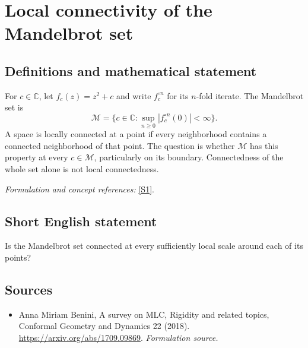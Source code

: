 \documentclass[11pt]{article}
\begin{document}
\section*{\texorpdfstring{Local connectivity of the Mandelbrot set}{Local connectivity of the Mandelbrot set}}\label{statement}
\subsection{Definitions and mathematical statement}
For $c\in{\mathbb{C}}$, let $f_c(z)=z^2+c$ and write $f_c^{\circ n}$ for its $n$-fold iterate. The Mandelbrot set is
\[
 \mathcal M=\{c\in{\mathbb{C}}:\sup_{n\ge0}|f_c^{\circ n}(0)|<\infty\}.
\]
A space is locally connected at a point if every neighborhood contains a connected neighborhood of that point. The question is whether $\mathcal M$ has this property at every $c\in\mathcal M$, particularly on its boundary. Connectedness of the whole set alone is not local connectedness.
\par\smallskip\textit{Formulation and concept references:} \href{https://arxiv.org/abs/1709.09869}{[S1]}.

\subsection{Short English statement}
Is the Mandelbrot set connected at every sufficiently local scale around each of its points?
\subsection{Sources}
\begin{itemize}
\item[S1]Anna Miriam Benini, A survey on MLC, Rigidity and related topics, Conformal Geometry and Dynamics 22 (2018).
\url{https://arxiv.org/abs/1709.09869}.
\textit{Formulation source.}
\end{itemize}
\end{document}
